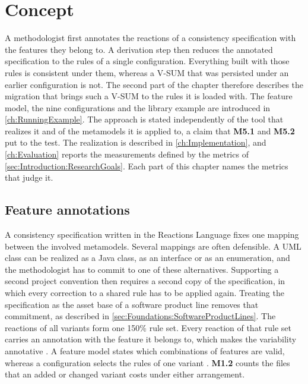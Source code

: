 \chapter{Concept}
\label{ch:Concept}

A methodologist first annotates the reactions of a consistency specification with the features they belong to.
A derivation step then reduces the annotated specification to the rules of a single configuration.
Everything built with those rules is consistent under them, whereas a V-SUM that was persisted under an earlier configuration is not.
The second part of the chapter therefore describes the migration that brings such a V-SUM to the rules it is loaded with.
The feature model, the nine configurations and the library example are introduced in \autoref{ch:RunningExample}.
The approach is stated independently of the tool that realizes it and of the metamodels it is applied to, a claim that \textbf{M5.1} and \textbf{M5.2} put to the test.
The realization is described in \autoref{ch:Implementation}, and \autoref{ch:Evaluation} reports the measurements defined by the metrics of \autoref{sec:Introduction:ResearchGoals}.
Each part of this chapter names the metrics that judge it.

\section{Feature annotations}
\label{sec:Concept:FeatureAnnotations}

A consistency specification written in the Reactions Language fixes one mapping between the involved metamodels.
Several mappings are often defensible.
A UML class can be realized as a Java class, as an interface or as an enumeration, and the methodologist has to commit to one of these alternatives.
Supporting a second project convention then requires a second copy of the specification, in which every correction to a shared rule has to be applied again.
Treating the specification as the asset base of a software product line removes that commitment, as described in \autoref{sec:Foundations:SoftwareProductLines}.
The reactions of all variants form one 150\% rule set.
Every reaction of that rule set carries an annotation with the feature it belongs to, which makes the variability annotative \cite{kaestner2008granularity}.
A feature model states which combinations of features are valid, whereas a configuration selects the rules of one variant \cite{apel2013software,czarnecki2005mapping}.
\textbf{M1.2} counts the files that an added or changed variant costs under either arrangement.

